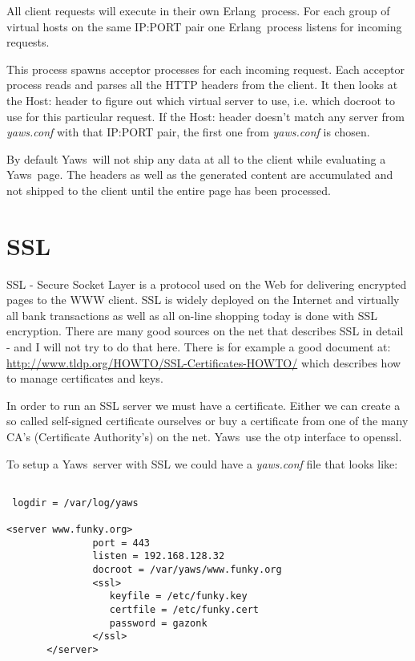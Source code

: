 \documentclass[11pt,oneside,english]{book}
\newcommand{\Erlang}            %
        {{\sc Erlang}}
\newcommand{\Yaws}            %
        {{\sc Yaws}}
\begin{document}
All client requests will execute in their own \Erlang\  process.
For each group of virtual hosts on the same IP:PORT pair
one \Erlang\  process listens for incoming requests.

This process spawns acceptor processes for each incoming request.
Each acceptor process reads and parses all the HTTP headers from the
client. It then looks at the Host: header to figure out which
virtual server to use, i.e. which docroot to use for this
particular request. If the Host: header doesn't match
any server from \textit{yaws.conf} with that IP:PORT pair, the first
one from \textit{yaws.conf} is chosen.


By default \Yaws\  will not ship any data at all to the client
while evaluating a \Yaws\  page. The headers as well as the generated
content are accumulated and not shipped to the client until the
entire page has been processed.



\chapter{SSL}

SSL - Secure Socket Layer is a protocol used on the Web for
delivering encrypted pages to the WWW client. SSL is widely deployed
on the Internet and virtually all bank transactions as well as all
on-line shopping today is done with SSL encryption. There are many
good sources on the net that describes SSL in detail - and I will not
try to do that here.
There  is for example a good document at:
\url{http://www.tldp.org/HOWTO/SSL-Certificates-HOWTO/} which
describes how to manage certificates and keys.

In order to run an SSL server we must have a certificate. Either we
can create a so called self-signed certificate ourselves or buy a
certificate from one of the many CA's (Certificate Authority's) on the
net. \Yaws\  use the otp interface to openssl.

To setup a \Yaws\  server with SSL we could have a \textit{yaws.conf} file that
looks like:

\begin{verbatim}

 logdir = /var/log/yaws

<server www.funky.org>
               port = 443
               listen = 192.168.128.32
               docroot = /var/yaws/www.funky.org
               <ssl>
                  keyfile = /etc/funky.key
                  certfile = /etc/funky.cert
                  password = gazonk
               </ssl>
       </server>
\end{verbatim}
\end{document}
